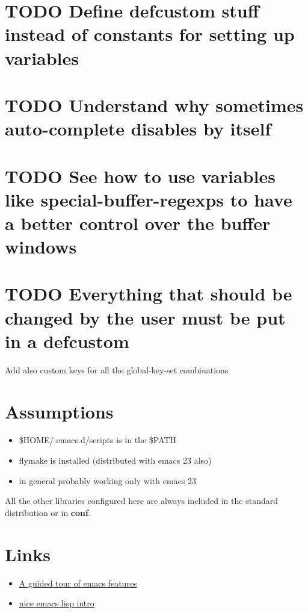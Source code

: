 \documentclass[11pt]{article}
\begin{document}
\section{\textbf{TODO} Define \textbf{defcustom} stuff instead of constants for setting up variables}
\label{sec-7}
\section{\textbf{TODO} Understand why sometimes auto-complete disables by itself}
\label{sec-8}
\section{\textbf{TODO} See how to use variables like \textbf{special-buffer-regexps} to have a better control over the buffer windows}
\label{sec-9}
\section{\textbf{TODO} Everything that should be changed by the user must be put in a defcustom}
\label{sec-10}

  Add also custom keys for all the global-key-set combinations
\section{Assumptions}
\label{sec-11}

\begin{itemize}
\item \$HOME/.emacs.d/scripts is in the \$PATH
\item flymake is installed (distributed with emacs 23 also)
\item in general probably working only with emacs 23
\end{itemize}

  All the other libraries configured here are always included in the standard distribution or in \textbf{conf}.
\section{Links}
\label{sec-12}

\begin{itemize}
\item \href{http://www.gnu.org/software/emacs/tour/}{A guided tour of emacs features}
\item \href{http://www.delorie.com/gnu/docs/emacs-lisp-intro/emacs-lisp-intro_toc.html}{nice emacs lisp intro}
\end{itemize}
\end{document}
